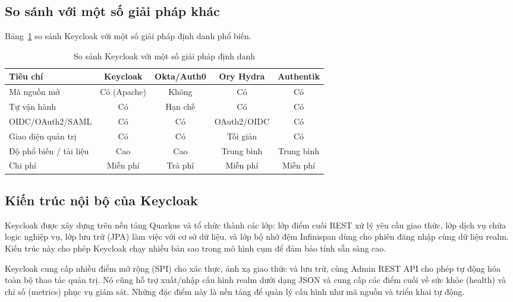 \subsection{So sánh với một số giải pháp khác}

Bảng~\ref{tab:ssosanh-idp} so sánh Keycloak với một số giải pháp định danh
phổ biến.

\begin{table}[htbp]
\centering
\caption{So sánh Keycloak với một số giải pháp định danh}
\label{tab:ssosanh-idp}
\small
\begin{tabular}{p{2.6cm} c c c c}
\toprule
\textbf{Tiêu chí} & \textbf{Keycloak} & \textbf{Okta/Auth0} & \textbf{Ory Hydra} & \textbf{Authentik}\\
\midrule
Mã nguồn mở     & Có (Apache) & Không & Có & Có\\
Tự vận hành     & Có     & Hạn chế & Có    & Có\\
OIDC/OAuth2/SAML& Có     & Có      & OAuth2/OIDC & Có\\
Giao diện quản trị & Có  & Có      & Tối giản & Có\\
Độ phổ biến / tài liệu & Cao & Cao & Trung bình & Trung bình\\
Chi phí         & Miễn phí & Trả phí & Miễn phí & Miễn phí\\
\bottomrule
\end{tabular}
\end{table}

\subsection{Kiến trúc nội bộ của Keycloak}
\label{subsec:kc-arch}

Keycloak được xây dựng trên nền tảng Quarkus và tổ chức thành các lớp: lớp điểm
cuối REST xử lý yêu cầu giao thức, lớp dịch vụ chứa logic nghiệp vụ, lớp lưu
trữ (JPA) làm việc với cơ sở dữ liệu, và lớp bộ nhớ đệm Infinispan dùng cho
phiên đăng nhập cùng dữ liệu realm. Kiến trúc này cho phép Keycloak chạy nhiều
bản sao trong mô hình cụm để đảm bảo tính sẵn sàng cao.

Keycloak cung cấp nhiều điểm mở rộng (SPI) cho xác thực, ánh xạ giao thức và
lưu trữ, cùng Admin REST API cho phép tự động hóa toàn bộ thao tác quản trị.
Nó cũng hỗ trợ xuất/nhập cấu hình realm dưới dạng JSON và cung cấp các điểm
cuối về sức khỏe (health) và chỉ số (metrics) phục vụ giám sát. Những đặc điểm
này là nền tảng để quản lý cấu hình như mã nguồn và triển khai tự động.

